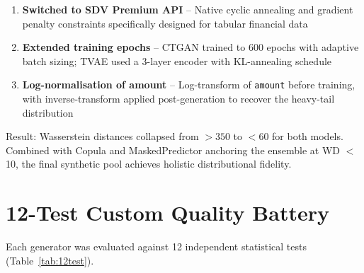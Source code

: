 \documentclass[12pt,a4paper,oneside]{book}
\begin{document}
\begin{enumerate}
    \item \textbf{Switched to SDV Premium API} -- Native cyclic annealing and gradient penalty constraints specifically designed for tabular financial data
    \item \textbf{Extended training epochs} -- CTGAN trained to 600 epochs with adaptive batch sizing; TVAE used a 3-layer encoder with KL-annealing schedule
    \item \textbf{Log-normalisation of amount} -- Log-transform of \texttt{amount} before training, with inverse-transform applied post-generation to recover the heavy-tail distribution
\end{enumerate}

Result: Wasserstein distances collapsed from $>350$ to $<60$ for both models. Combined with Copula and MaskedPredictor anchoring the ensemble at WD $<$10, the final synthetic pool achieves holistic distributional fidelity.

\section{12-Test Custom Quality Battery}

Each generator was evaluated against 12 independent statistical tests (Table~\ref{tab:12test}).
\end{document}
